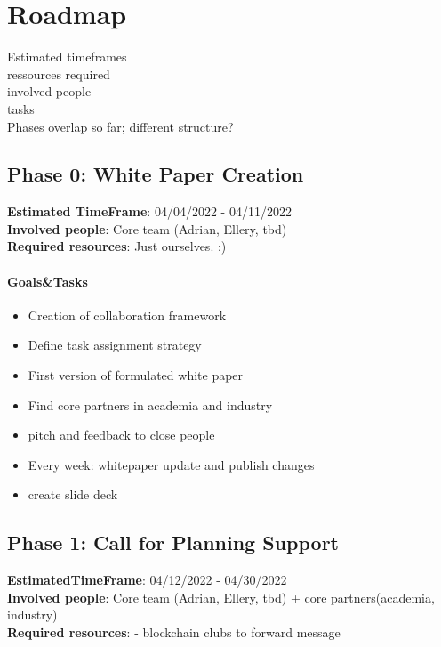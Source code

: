 \section{Roadmap}
\setcounter{subsection}{-1}
Estimated timeframes\\
ressources required\\
involved people\\
tasks\\
Phases overlap so far; different structure?
\subsection*{Phase 0: White Paper Creation}
\textbf{Estimated TimeFrame}:
04/04/2022 - 04/11/2022 \\
\textbf{Involved people}:
Core team (Adrian, Ellery, tbd) \\
\textbf{Required resources}:
Just ourselves. :) \\



\paragraph{Goals\&Tasks}
\begin{itemize}
    \item Creation of collaboration framework
    \item Define task assignment strategy
    \item First version of formulated white paper
    \item Find core partners in academia and industry
    \item pitch and feedback to close people
    \item Every week: whitepaper update and publish changes
    \item create slide deck
\end{itemize}

\subsection*{Phase 1: Call for Planning Support}
\textbf{EstimatedTimeFrame}:
04/12/2022 - 04/30/2022 \\
\textbf{Involved people}:
Core team (Adrian, Ellery, tbd) + core partners(academia, industry) \\
\textbf{Required resources}:
- blockchain clubs to forward message \\

